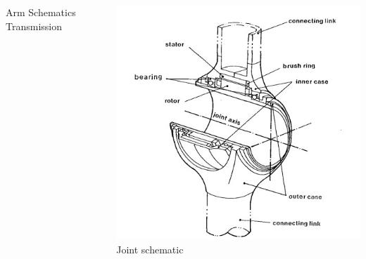 \begin{frame}
\begin{columns}[t]
\begin{column}{.45\columnwidth}
\begin{minipage}[b]{\textwidth}
				\footnotesize{Arm Schematics Transmission} %
		\end{minipage}
	\end{column}
	\begin{column}{.45\columnwidth}
		\begin{minipage}[b]{\textwidth}
			\includegraphics[width=1.2\textwidth, height=1.2\textwidth]{figures/dd_joints.jpg} \\
			\footnotesize{Joint schematic} %
	\end{minipage}
	\end{column}
\end{columns}
\end{frame}

